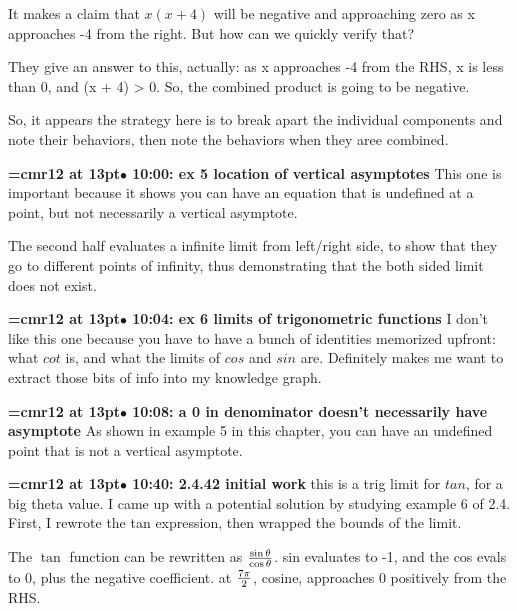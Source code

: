 It makes a claim that $x(x + 4)$ will be negative and approaching zero as x approaches -4 from the right. But how can we quickly verify that?
\par

They give an answer to this, actually: as x approaches -4 from the RHS, x is less than 0, and (x + 4) > 0. So, the combined product is going to be negative.
\par

So, it appears the strategy here is to break apart the individual components and note their behaviors, then note the behaviors when they aree combined.
\par

{\smallskip\noindent\bf\font\titlefont=cmr12 at 13pt\titlefont $\bullet$ 10:00: ex 5 location of vertical asymptotes}\smallskip
This one is important because it shows you can have an equation that is undefined at a point, but not necessarily a vertical asymptote.
\par

The second half evaluates a infinite limit from left/right side, to show that they go to different points of infinity, thus demonstrating that the both sided limit does not exist.
\par

{\smallskip\noindent\bf\font\titlefont=cmr12 at 13pt\titlefont $\bullet$ 10:04: ex 6 limits of trigonometric functions}\smallskip
I don't like this one because you have to have a bunch of identities memorized upfront: what $cot$ is, and what the limits of $cos$ and $sin$ are. Definitely makes me want to extract those bits of info into my knowledge graph.
\par

{\smallskip\noindent\bf\font\titlefont=cmr12 at 13pt\titlefont $\bullet$ 10:08: a 0 in denominator doesn't necessarily have asymptote}\smallskip
As shown in example 5 in this chapter, you can have an undefined point that is not a vertical asymptote.
\par

{\smallskip\noindent\bf\font\titlefont=cmr12 at 13pt\titlefont $\bullet$ 10:40: 2.4.42 initial work}\smallskip
this is a trig limit for $tan$, for a big theta value. I came up with a potential solution by studying example 6 of 2.4. First, I rewrote the tan expression, then wrapped the bounds of the limit.
\par

The $\tan$ function can be rewritten as ${\sin \theta \over \cos \theta}$. sin evaluates to -1, and the cos evals to 0, plus the negative coefficient. at $7\pi \over 2$, cosine, approaches 0 positively from the RHS.
\par

